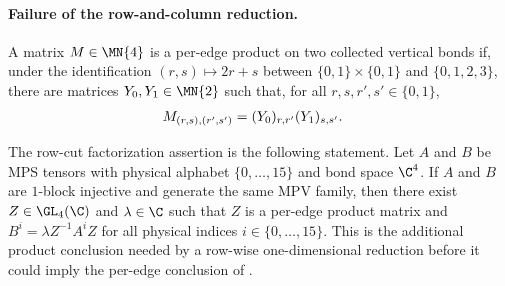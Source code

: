 \paragraph{Failure of the row-and-column reduction.}

\begin{definition}%
    \label{def:peps_row_cut_per_edge_product}
    \leanok
    A matrix $M\in \MN{4}$ is a per-edge product on two collected vertical
    bonds if, under the identification
    $(r,s)\longmapsto 2r+s$ between
    $\{0,1\}\times\{0,1\}$ and $\{0,1,2,3\}$, there are matrices
    $Y_0,Y_1\in \MN{2}$ such that, for all
    $r,s,r',s'\in\{0,1\}$,
    \begin{align}
        M_{(r,s),(r',s')}
         & =(Y_0)_{r,r'}(Y_1)_{s,s'}.
        \notag
    \end{align}
\end{definition}

\begin{definition}%
    \label{def:peps_row_cut_gauge_factorizes}
    \leanok
    The row-cut factorization assertion is the following statement. Let $A$
    and $B$ be MPS tensors with physical alphabet $\{0,\ldots,15\}$ and
    bond space $\C^4$. If $A$ and $B$ are $1$-block injective and generate
    the same MPV family, then there exist $Z\in \GL_4(\C)$ and
    $\lambda\in\C$ such that $Z$ is a per-edge product matrix and
    $B^i=\lambda Z^{-1}A^iZ$ for all physical indices
    $i\in\{0,\ldots,15\}$. This is the additional product conclusion needed
    by a row-wise one-dimensional reduction before it could imply the per-edge
    conclusion of \cite[Theorem~3]{Molnar2018NormalPEPS}.
\end{definition}

